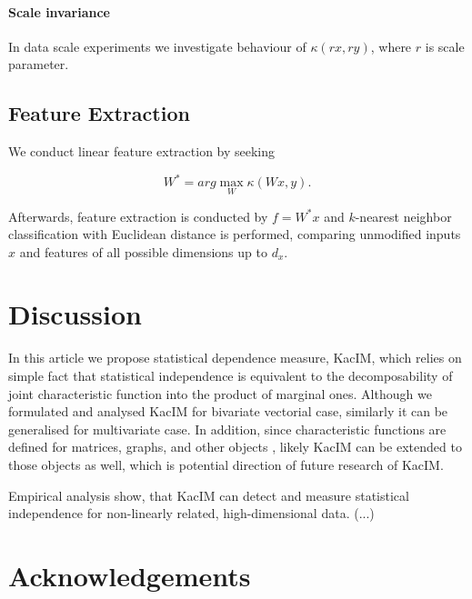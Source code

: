 \documentclass{article}
\begin{document}
\paragraph{Scale invariance} In data scale experiments we investigate behaviour of $\kappa(rx, ry)$, where $r$ is scale parameter.




\subsection{Feature Extraction}

We conduct linear feature extraction by seeking 

\begin{equation}
\label{eq:kim_feature_extraction}    
W^{*} = arg \max_{W} \kappa(Wx, y).
\end{equation}



\noindent Afterwards, feature extraction is conducted by $f = W^{*}x$ and $k$-nearest neighbor classification with Euclidean distance is performed, comparing unmodified inputs $x$ and features of all possible dimensions up to $d_{x}$.

\section{Discussion} 

\label{section:discussion}
In this article we propose statistical dependence measure, KacIM, which relies on simple fact that statistical independence is equivalent to the decomposability of joint characteristic function  into the product of marginal ones. Although we formulated and analysed KacIM for bivariate vectorial case, similarly it can be generalised for multivariate case. In addition, since characteristic functions are defined for matrices, graphs, and other objects \cite{?}, likely KacIM can be extended to those objects as well, which is potential direction of future research of KacIM.

Empirical analysis show, that KacIM can detect and measure statistical independence for non-linearly related, high-dimensional data. (...)

\section{Acknowledgements}
\end{document}
